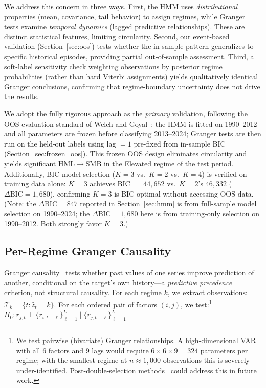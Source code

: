 \documentclass[sigconf,anonymous]{acmart}
\begin{document}
We address this concern in three ways. First, the HMM uses \emph{distributional}
properties (mean, covariance, tail behavior) to assign regimes, while Granger
tests examine \emph{temporal dynamics} (lagged predictive relationships). These
are distinct statistical features, limiting circularity. Second, our event-based
validation (Section~\ref{sec:oos}) tests whether the in-sample pattern generalizes
to specific historical episodes, providing partial out-of-sample assessment.
Third, a soft-label sensitivity check weighting observations by posterior regime
probabilities (rather than hard Viterbi assignments) yields qualitatively
identical Granger conclusions, confirming that regime-boundary uncertainty
does not drive the results.

We adopt the fully rigorous approach as the \emph{primary} validation,
following the OOS evaluation standard of Welch and Goyal~\cite{welch2008comprehensive}:
the HMM is fitted on 1990--2012 and all parameters are frozen before
classifying 2013--2024; Granger tests are then run on the held-out labels
using lag $= 1$ pre-fixed from in-sample BIC
(Section~\ref{sec:frozen_oos}). This frozen OOS design eliminates circularity
and yields significant HML$\to$SMB in the Elevated regime of the test period.
Additionally, BIC model selection ($K=3$ vs.\ $K=2$ vs.\ $K=4$) is verified on
training data alone: $K=3$ achieves BIC~$= 44{,}652$ vs.\ $K=2$'s $46{,}332$
($\Delta\text{BIC} = 1{,}680$), confirming $K=3$ is BIC-optimal without
accessing OOS data. (Note: the $\Delta\text{BIC} = 847$ reported in
Section~\ref{sec:hmm} is from full-sample model selection on 1990--2024;
the $\Delta\text{BIC} = 1{,}680$ here is from training-only selection on
1990--2012. Both strongly favor $K=3$.)

\subsection{Per-Regime Granger Causality}
\label{sec:granger_method}

Granger causality~\cite{granger1969investigating,shojaie2022granger} tests whether past values
of one series improve prediction of another, conditional on the target's own history---a
\emph{predictive precedence} criterion, not structural causality.
For each regime $k$, we extract observations: $\mathcal{T}_k = \{t : \hat{z}_t = k\}$.
For each ordered pair of factors $(i, j)$, we test:\footnote{We test pairwise
(bivariate) Granger relationships. A high-dimensional VAR with all 6 factors and 9 lags
would require $6 \times 6 \times 9 = 324$ parameters per regime; with the smallest regime
at $n \approx 1{,}000$ observations this is severely under-identified. Post-double-selection
methods~\cite{hecq2023granger} could address this in future work.}
$H_0: r_{j,t} \perp \{r_{i,t-\ell}\}_{\ell=1}^{L} \mid \{r_{j,t-\ell}\}_{\ell=1}^{L}$
\end{document}
